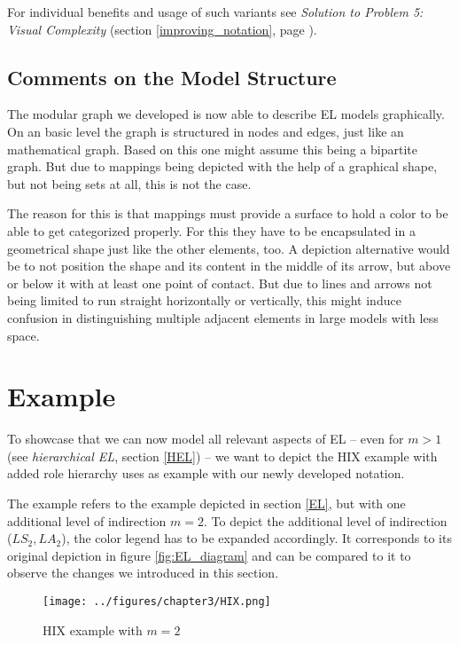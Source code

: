 \documentclass[twoside, openright, 12pt]{book}
\begin{document}
\noindent
For individual benefits and usage of such variants see \textit{Solution to Problem 5: Visual Complexity} (section \ref{improving_notation}, page \pageref{improving_notation}).



\subsection{Comments on the Model Structure}
\label{comments_on_model_structure}
The modular graph we developed is now able to describe EL models graphically.
On an basic level the graph is structured in nodes and edges, just like an mathematical graph.
Based on this one might assume this being a bipartite graph.
But due to mappings being depicted with the help of a graphical shape, but not being sets at all, this is not the case.

The reason for this is that mappings must provide a surface to hold a color to be able to get categorized properly.
For this they have to be encapsulated in a geometrical shape just like the other elements, too.
A depiction alternative would be to not position the shape and its content in the middle of its arrow, but above or below it with at least one point of contact.
But due to lines and arrows not being limited to run straight horizontally or vertically, this might induce confusion in distinguishing multiple adjacent elements in large models with less space.



\section{Example}
\label{gsl_example}
To showcase that we can now model all relevant aspects of EL -- even for $m>1$ (see \textit{hierarchical EL}, section \ref{HEL}) -- we want to depict the HIX example with added role hierarchy \cite{Amthor18} uses as example with our newly developed notation.

\noindent
The example refers to the example depicted in section \ref{EL}, but with one additional level of indirection $m=2$.
To depict the additional level of indirection ($LS_2, LA_2$), the color legend has to be expanded accordingly.
It corresponds to its original depiction in figure \ref{fig:EL_diagram} and can be compared to it to observe the changes we introduced in this section.

\begin{figure}[htb]
	\centering
	\texttt{[image: ../figures/chapter3/HIX.png]}
	\caption{HIX example with $m=2$ \citep{Amthor18}}
	\label{fig:HIX}
\end{figure}
\end{document}
